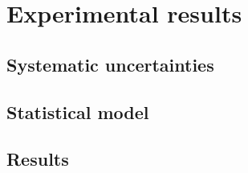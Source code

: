 
\chapter{Experimental results}
\label{chap:results}

\section{Systematic uncertainties}
	\label{sec:systematics}
	
\section{Statistical model}
	\label{sec:stats}
	
\section{Results}
	\label{sec:results}
	



